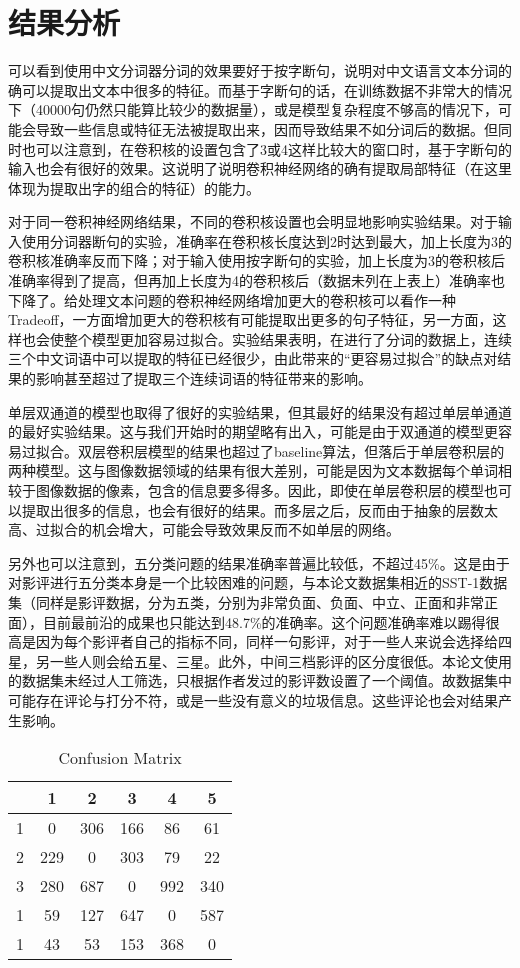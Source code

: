 \section{结果分析}
可以看到使用中文分词器分词的效果要好于按字断句，说明对中文语言文本分词的确可以提取出文本中很多的特征。而基于字断句的话，在训练数据不非常大的情况下（40000句仍然只能算比较少的数据量），或是模型复杂程度不够高的情况下，可能会导致一些信息或特征无法被提取出来，因而导致结果不如分词后的数据。但同时也可以注意到，在卷积核的设置包含了3或4这样比较大的窗口时，基于字断句的输入也会有很好的效果。这说明了说明卷积神经网络的确有提取局部特征（在这里体现为提取出字的组合的特征）的能力。

对于同一卷积神经网络结果，不同的卷积核设置也会明显地影响实验结果。对于输入使用分词器断句的实验，准确率在卷积核长度达到2时达到最大，加上长度为3的卷积核准确率反而下降；对于输入使用按字断句的实验，加上长度为3的卷积核后准确率得到了提高，但再加上长度为4的卷积核后（数据未列在上表上）准确率也下降了。给处理文本问题的卷积神经网络增加更大的卷积核可以看作一种Tradeoff，一方面增加更大的卷积核有可能提取出更多的句子特征，另一方面，这样也会使整个模型更加容易过拟合。实验结果表明，在进行了分词的数据上，连续三个中文词语中可以提取的特征已经很少，由此带来的“更容易过拟合”的缺点对结果的影响甚至超过了提取三个连续词语的特征带来的影响。

单层双通道的模型也取得了很好的实验结果，但其最好的结果没有超过单层单通道的最好实验结果。这与我们开始时的期望略有出入，可能是由于双通道的模型更容易过拟合。双层卷积层模型的结果也超过了baseline算法，但落后于单层卷积层的两种模型。这与图像数据领域的结果有很大差别，可能是因为文本数据每个单词相较于图像数据的像素，包含的信息要多得多。因此，即使在单层卷积层的模型也可以提取出很多的信息，也会有很好的结果。而多层之后，反而由于抽象的层数太高、过拟合的机会增大，可能会导致效果反而不如单层的网络。

另外也可以注意到，五分类问题的结果准确率普遍比较低，不超过45\%。这是由于对影评进行五分类本身是一个比较困难的问题，与本论文数据集相近的SST-1数据集（同样是影评数据，分为五类，分别为非常负面、负面、中立、正面和非常正面），目前最前沿的成果也只能达到48.7\%的准确率。这个问题准确率难以踢得很高是因为每个影评者自己的指标不同，同样一句影评，对于一些人来说会选择给四星，另一些人则会给五星、三星。此外，中间三档影评的区分度很低。本论文使用的数据集未经过人工筛选，只根据作者发过的影评数设置了一个阈值。故数据集中可能存在评论与打分不符，或是一些没有意义的垃圾信息。这些评论也会对结果产生影响。

\begin{table}
\centering
\caption{Confusion Matrix} \label{tab:confusion}
\begin{tabular}{c|c|c|c|c|c}
    \hline
     & 1 & 2 & 3 & 4 & 5\\
    \hline
    1 & 0 & 306 & 166 & 86 & 61\\
    \hline
    2 & 229 & 0 & 303 & 79 & 22 \\
    \hline
    3 & 280 & 687 & 0 & 992 & 340 \\
    \hline
    1 & 59 & 127 & 647 & 0 & 587\\
    \hline
    1 & 43 & 53 & 153 & 368 & 0\\
    \hline
\end{tabular}
\end{table}

